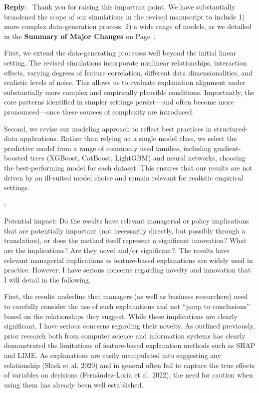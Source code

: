 \documentclass[11pt]{article}
\newcounter{se}[section]
\newcounter{reviewer}
\newcounter{point}[reviewer]
\renewcommand{\thepoint}{R\,\thereviewer.\arabic{point}}
\newenvironment{point}{
    \refstepcounter{point} \bigskip \noindent {\textbf{\thepoint}}: \rmfamily \itshape
}{\medskip}
\newenvironment{reply}
 {\par\medskip \noindent \begin{sf}\textbf{Reply}:\ }
 {\medskip \end{sf}}
\begin{document}
\begin{reply}
Thank you for raising this important point.  We have substantially broadened the scope of our simulations in the revised manuscript to include 1) more complex data-generation process; 2) a wide range of models, as we detailed in the \textbf{Summary of Major Changes} on Page~\pageref{sec:majorchanges}.

First, we extend the data-generating processes well beyond the initial linear setting. The revised simulations incorporate nonlinear relationships, interaction effects, varying degrees of feature correlation, different data dimensionalities, and realistic levels of noise. This allows us to evaluate explanation alignment under substantially more complex and empirically plausible conditions. Importantly, the core patterns identified in simpler settings persist—and often become more pronounced—once these sources of complexity are introduced.

Second, we revise our modeling approach to reflect best practices in structured-data applications. Rather than relying on a single model class, we select the predictive model from a range of commonly used families, including gradient-boosted trees (XGBoost, CatBoost, LightGBM) and neural networks, choosing the best-performing model for each dataset. This ensures that our results are not driven by an ill-suited model choice and remain relevant for realistic empirical settings.
\end{reply}


\begin{point}
Potential impact: Do the results have relevant managerial or policy implications that are potentially important (not necessarily directly, but possibly through a translation), or does the method itself represent a significant innovation? What are the implications? Are they novel and/or significant?: The results have relevant managerial implications as feature-based explanations are widely used in practice. However, I have serious concerns regarding novelty and innovation that I will detail in the following.

First, the results underline that managers (as well as business researchers) need to carefully consider the use of such explanations and not “jump to conclusions” based on the relationships they suggest. While these implications are clearly significant, I have serious concerns regarding their novelty. As outlined previously, prior research both from computer science and information systems has clearly demonstrated the limitations of feature-based explanation methods such as SHAP and LIME. As explanations are easily manipulated into suggesting any relationship (Slack et al. 2020) and in general often fail to capture the true effects of variables on decisions (Fernández-Loría et al. 2022), the need for caution when using them has already been well established.
\end{point}
\end{document}
